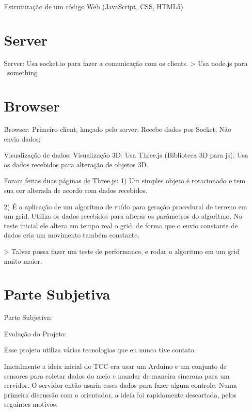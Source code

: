 \documentclass[a4paper,12pt]{article}
\begin{document}
Estruturação de um código Web (JavaScript, CSS, HTML5)







\section{Server}

Server:
  Usa socket.io para fazer a comunicação com os clients.
  > Usa node.js para ~something~









\section{Browser}

Browser:
  Primeiro client, lançado pelo server;
  Recebe dados por Socket;
  Não envia dados;


  Visualização de dados;
    Visualização 3D:
      Usa Three.js (Biblioteca 3D para js);
      Usa os dados recebidos para alteração de objetos 3D.


      Foram feitas duas páginas de Three.js:
        1) Um simples objeto é rotacionado e tem sua cor alterada de acordo com dados recebidos.


        2) É a aplicação de um algoritmo de ruído para geração procedural de terreno em um grid. Utiliza os dados recebidos para alterar os parâmetros do algoritmo.
          No teste inicial ele altera em tempo real o grid, de forma que o envio constante de dados cria um movimento também constante.


          > Talvez possa fazer um teste de performance, e rodar o algoritmo em um grid muito maior.







\section{Parte Subjetiva}

Parte Subjetiva:




Evolução do Projeto:


Esse projeto utiliza várias tecnologias que eu nunca tive contato.


Inicialmente a ideia inicial do TCC era usar um Arduino e um conjunto de sensores para coletar dados do meio e mandar de maneira síncrona para um servidor. O servidor então usaria esses dados para fazer algum controle. Numa primeira discussão com o orientador, a ideia foi rapidamente descartada, pelos seguintes motivos:
\end{document}
